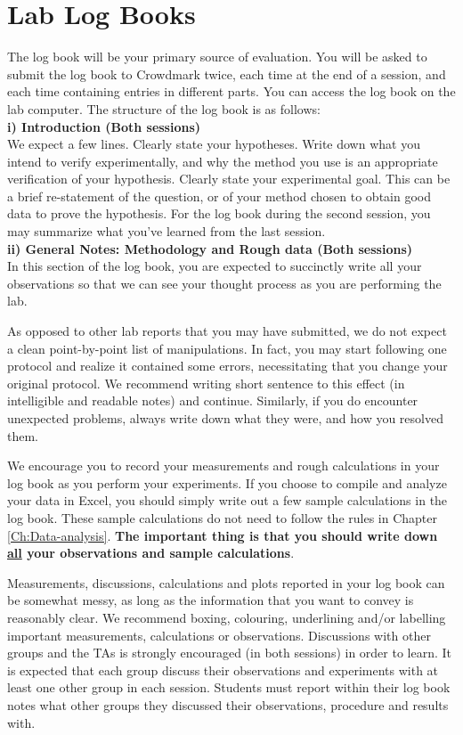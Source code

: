 \documentclass[12pt]{report}
\begin{document}
\section{Lab Log Books}
The log book will be your primary source of evaluation. You will be asked to submit the log book to Crowdmark twice, each time at the end of a session, and each time containing entries in different parts. You can access the log book on the lab computer. The structure of the log book is as follows:\\
 
\noindent \textbf{i) Introduction (Both sessions)} \\
\noindent We expect a few lines. Clearly state your hypotheses. Write down what you intend to verify experimentally, and why the method you use is an appropriate verification of your hypothesis. Clearly state your experimental goal. This can be a brief re-statement of the question, or of your method chosen to obtain good data to prove the hypothesis.
For the log book during the second session, you may summarize what you've learned from the last session. \\

\noindent \textbf{ii) General Notes: Methodology and Rough data (Both sessions)} \\
In this section of the log book, you are  expected to succinctly write all your observations so that we can see your thought process as you are performing the lab. 

As opposed to other lab reports that you may have submitted, we do not expect a clean point-by-point list of manipulations. In fact, you may start following one protocol and realize it contained  some errors, necessitating that you change your original protocol. We recommend writing short sentence to this effect (in intelligible and readable notes) and continue. Similarly, if you do encounter unexpected problems, always write down what they were, and how you resolved them.

We encourage you to record your measurements and rough calculations in your log book as you perform your experiments. If you choose to compile and analyze your data in Excel, you should simply write out a few sample calculations in the log book. These sample calculations do not need to follow the rules  in Chapter \ref{Ch:Data-analysis}. \textbf{ The important thing is that you should write down \underline{all} your observations and sample calculations}. 

Measurements, discussions, calculations and plots reported in your log book can be somewhat messy, as long as the information that you want to convey is reasonably clear.  
We recommend boxing, colouring, underlining and/or labelling important measurements, calculations or observations. 
Discussions with other groups and the TAs is strongly encouraged (in both sessions) in order to learn. 
It is expected that each group discuss their observations and experiments with at least one other group in each session. Students must report within their log book notes what other groups they discussed their observations, procedure and results with.
 \\
\end{document}
